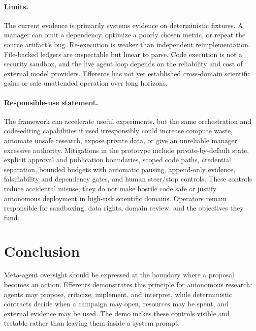 \documentclass{article}
\begin{document}
\paragraph{Limits.}
The current evidence is primarily systems evidence on deterministic fixtures. A manager can omit a dependency, optimize a poorly chosen metric, or repeat the source artifact's bug. Re-execution is weaker than independent reimplementation. File-backed ledgers are inspectable but linear to parse. Code execution is not a security sandbox, and the live agent loop depends on the reliability and cost of external model providers. Efferents has not yet established cross-domain scientific gains or safe unattended operation over long horizons.

\paragraph{Responsible-use statement.}
The framework can accelerate useful experiments, but the same orchestration and code-editing capabilities if used irresponsibly could increase compute waste, automate unsafe research, expose private data, or give an unreliable manager excessive authority. Mitigations in the prototype include private-by-default state, explicit approval and publication boundaries, scoped code paths, credential separation, bounded budgets with automatic pausing, append-only evidence, falsifiability and dependency gates, and human steer/stop controls. These controls reduce accidental misuse; they do not make hostile code safe or justify autonomous deployment in high-risk scientific domains. Operators remain responsible for sandboxing, data rights, domain review, and the objectives they fund.

\section{Conclusion}

Meta-agent oversight should be expressed at the boundary where a proposal becomes an action. Efferents demonstrates this principle for autonomous research: agents may propose, criticize, implement, and interpret, while deterministic contracts decide when a campaign may open, resources may be spent, and external evidence may be used. The demo makes these controls visible and testable rather than leaving them inside a system prompt.



\end{document}
